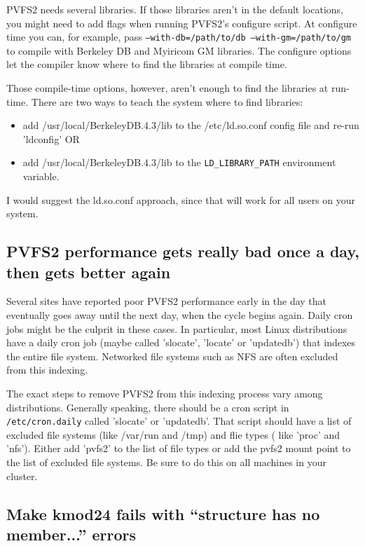 \documentclass[11pt,letterpaper]{article}
\begin{document}
PVFS2 needs several libraries.  If those libraries aren't in the default
locations, you might need to add flags when running PVFS2's configure script.
At configure time you can, for example, pass \texttt{--with-db=/path/to/db
--with-gm=/path/to/gm} to compile with Berkeley DB and Myiricom GM libraries.
The configure options let the compiler know where to find the libraries at
compile time.  

Those compile-time options, however, aren't enough to find the libraries at
run-time.  There are two ways to teach the system where to find libraries:  

\begin{itemize}
\item add /usr/local/BerkeleyDB.4.3/lib to the /etc/ld.so.conf config file
  and re-run 'ldconfig' OR
\item add /usr/local/BerkeleyDB.4.3/lib to the \texttt{LD\_LIBRARY\_PATH}
    environment variable.
\end{itemize}

I would suggest the ld.so.conf approach, since that will work for all users on
your system.

\subsection{PVFS2 performance gets really bad once a day, then gets
     better again}

Several sites have reported poor PVFS2 performance early in the day that
eventually goes away until the next day, when the cycle begins again.  Daily
cron jobs might be the culprit in these cases.  In particular, most Linux
distributions have a daily cron job (maybe called 'slocate', 'locate' or
'updatedb') that indexes the entire file system.  Networked file systems such
as NFS are often excluded from this indexing.  

The exact steps to remove PVFS2 from this indexing process vary among
distributions.  Generally speaking, there should be a cron script in
\texttt{/etc/cron.daily} called 'slocate' or 'updatedb'.  That script should
have a list of excluded file systems (like /var/run and /tmp) and flie types (
like 'proc' and 'nfs').  Either add 'pvfs2' to the list of file types or add
the pvfs2 mount point to the list of excluded file systems.   Be sure to do
this on all machines in your cluster.  

\subsection{Make kmod24 fails with ``structure has no member...'' errors}
\end{document}
